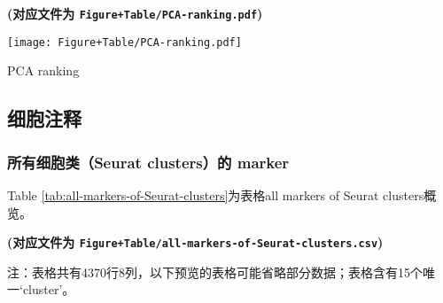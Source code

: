 \documentclass[
]{article}
\begin{document}
\textbf{(对应文件为 \texttt{Figure+Table/PCA-ranking.pdf})}

\def\@captype{figure}
\begin{center}
\texttt{[image: Figure+Table/PCA-ranking.pdf]}
\caption{PCA ranking}\label{fig:PCA-ranking}
\end{center}

\hypertarget{ux7ec6ux80deux6ce8ux91ca}{%
\subsection{细胞注释}\label{ux7ec6ux80deux6ce8ux91ca}}

\hypertarget{ux6240ux6709ux7ec6ux80deux7c7bseurat-clustersux7684-marker}{%
\subsubsection{所有细胞类（Seurat clusters）的 marker}\label{ux6240ux6709ux7ec6ux80deux7c7bseurat-clustersux7684-marker}}

Table \ref{tab:all-markers-of-Seurat-clusters}为表格all markers of Seurat clusters概览。

\textbf{(对应文件为 \texttt{Figure+Table/all-markers-of-Seurat-clusters.csv})}

\begin{center}\begin{tcolorbox}[colback=gray!10, colframe=gray!50, width=0.9\linewidth, arc=1mm, boxrule=0.5pt]注：表格共有4370行8列，以下预览的表格可能省略部分数据；表格含有15个唯一`cluster'。
\end{tcolorbox}
\end{center}
\end{document}

